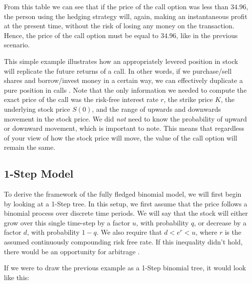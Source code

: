 \documentclass[letterpaper,12pt]{article}
\theoremstyle{plain}
\numberwithin{equation}{section}
\begin{document}
From this table we can see that if the price of the call option was less than $34.96$, the person using the hedging strategy will, again, making an instantaneous profit at the present time, without the risk of losing any money on the transaction. Hence, the price of the call option must be equal to $34.96$, like in the previous scenario.

This simple example illustrates how an appropriately levered position in stock will replicate the future returns of a call. In other words, if we purchase/sell shares and borrow/invest money in a certain way, we can effectively duplicate a pure position in calls \cite{CRR}. Note that the only information we needed to compute the exact price of the call was the risk-free interest rate $r$, the strike price $K$, the underlying stock price $S(0)$, and the range of upwards and downwards movement in the stock price. We did {\em not} need to know the probability of upward or downward movement, which is important to note. This means that regardless of your view of how the stock price will move, the value of the call option will remain the same.


\subsection{1-Step Model}


To derive the framework of the fully fledged binomial model, we will first begin by looking at a 1-Step tree. In this setup, we first assume that the price follows a binomial process over discrete time periods. We will say that the stock will either grow over this single time-step by a factor $u$, with probability $q$, or decrease by a factor $d$, with probability $1-q$. We also require that $d < e^r < u$, where $r$ is the assumed continuously compounding risk free rate. If this inequality didn't hold, there would be an opportunity for arbitrage \cite{MFF}. 

If we were to draw the previous example as a 1-Step binomial tree, it would look like this:

\begin{figure}[H]
\centering
{}

\end{figure}
\end{document}
